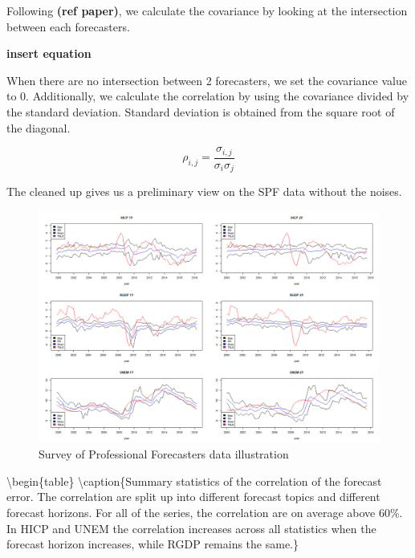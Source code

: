 \documentclass[]{article}
\begin{document}
Following \textbf{(ref paper)}, we calculate the covariance by looking
at the intersection between each forecasters.

\textbf{insert equation}

When there are no intersection between 2 forecasters, we set the
covariance value to 0. Additionally, we calculate the correlation by
using the covariance divided by the standard deviation. Standard
deviation is obtained from the square root of the diagonal.

\begin{equation}
\label{eqn: cov2cor}
\rho_{i,j} = \frac{\sigma_{i,j}}{\sigma_{i}\sigma_{j}}
\end{equation}

The cleaned up gives us a preliminary view on the SPF data without the
noises.

\begin{figure}[!h]
\centering
\includegraphics{./Output/Images/SPF.png}
\caption{Survey of Professional Forecasters data illustration}\label{fig: SPF data illustration}
\end{figure}

\textbackslash{}begin\{table\} \centering
\textbackslash{}caption\{Summary statistics of the correlation of the
forecast error. The correlation are split up into different forecast
topics and different forecast horizons. For all of the series, the
correlation are on average above 60\%. In HICP and UNEM the correlation
increases across all statistics when the forecast horizon increases,
while RGDP remains the same.\}
\label{tab: correlation summary statistics}
\end{document}
